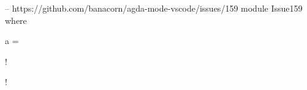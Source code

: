 -- https://github.com/banacorn/agda-mode-vscode/issues/159
module Issue159 where

\begin{code}
a = {!

!}
\end{code}